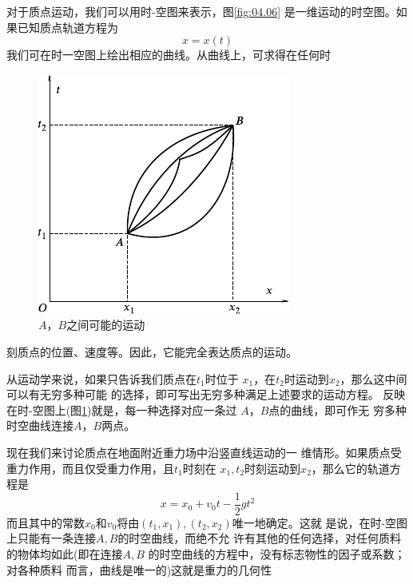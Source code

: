 对于质点运动，我们可以用时-空图来表示，图\ref{fig:04.06}
是一维运动的时空图。如果已知质点轨道方程为
\begin{equation*}
  x = x \left( t \right)
\end{equation*}
我们可在时一空图上绘出相应的曲线。从曲线上，可求得在任何时
\begin{figure}
  \vspace{-1em}
  \centering
  \includegraphics{figure/fig04.07}
  \caption{$ A $，$ B $之间可能的运动}
  \label{fig:04.07}
\end{figure}
刻质点的位置、速度等。因此，它能完全表达质点的运动。

从运动学来说，如果只告诉我们质点在$ t_1 $时位于
$ x_1 $，在$ t_2 $时运动到$ x_2 $，那么这中间可以有无穷多种可能
的选择，即可写出无穷多种满足上述要求的运动方程。
反映在时-空图上(图\ref{fig:04.07})就是，每一种选择对应一条过
$ A $，$ B $点的曲线，即可作无
穷多种时空曲线连接$ A $，$ B $两点。

现在我们来讨论质点在地面附近重力场中沿竖直线运动的一
维情形。如果质点受重力作用，而且仅受重力作用，且$ t _ { 1 } $时刻在
$ x _ { 1 } , t _ { 2 } $时刻运动到$ x _ { 2 } $，那么它的轨道方程是
\begin{equation*}
  x = x _ { 0 } + v _ { 0 } t - \frac { 1 } { 2 } g t ^ { 2 }
\end{equation*}
而且其中的常数$ x _ { 0 } $和$ v _ { 0 } $将由$ \left( t _ { 1 }, x _ { 1 } \right) , \left( t _ { 2 } , x _ { 2 } \right) $唯一地确定。这就
是说，在时-空图上只能有一条连接$ A , B $的时空曲线，而绝不允
许有其他的任何选择，对任何质料的物体均如此(即在连接$ A , B $
的时空曲线的方程中，没有标志物性的因子或系数；对各种质料
而言，曲线是唯一的)这就是重力的几何性

